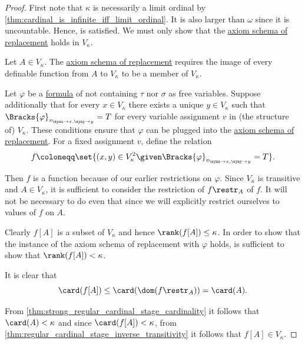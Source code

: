 \begin{proof}
  First note that \( \kappa \) is necessarily a limit ordinal by \cref{thm:cardinal_is_infinite_iff_limit_ordinal}. It is also larger than \( \omega \) since it is uncountable. Hence,  is satisfied. We must only show that the \hyperref[def:zfc/replacement]{axiom schema of replacement} holds in \( V_\kappa \).

  Let \( A \in V_\kappa \). The \hyperref[def:zfc/replacement]{axiom schema of replacement} requires the image of every definable function from \( A \) to \( V_\kappa \) to be a member of \( V_\kappa \).

  Let \( \varphi \) be a \hyperref[def:fol_formula]{formula} of \hyperref[def:zfc]{} not containing \( \tau \) nor \( \sigma \) as free variables. Suppose additionally that for every \( x \in V_\kappa \) there exists a unique \( y \in V_\kappa \) such that \( \Bracks{\varphi}_{v_{\synx \to x, \syny \to y}} = T \) for every variable assignment \( v \) in (the structure of) \( V_\kappa \). These conditions ensure that \( \varphi \) can be plugged into the \hyperref[def:zfc/replacement]{axiom schema of replacement}. For a fixed assignment \( v \), define the relation
  \begin{equation*}
    f \coloneqq \set{ (x, y) \in V_\kappa^2 \given \Bracks{\varphi}_{v_{\synx \to x, \syny \to y}} = T }.
  \end{equation*}

  Then \( f \) is a function because of our earlier restrictions on \( \varphi \). Since \( V_\kappa \) is transitive and \( A \in V_\kappa \), it is sufficient to consider the restriction of \( f\restr_A \) of \( f \). It will not be necessary to do even that since we will explicitly restrict ourselves to values of \( f \) on \( A \).

  Clearly \( f[A] \) is a subset of \( V_\kappa \) and hence \( \rank(f[A]) \leq \kappa \). In order to show that the instance of the axiom schema of replacement with \( \varphi \) holds, is sufficient to show that \( \rank(f[A]) < \kappa \).

  It is clear that
  \begin{equation*}
    \card(f[A]) \leq \card(\dom(f\restr_A)) = \card(A).
  \end{equation*}

  From \cref{thm:strong_regular_cardinal_stage_cardinality} it follows that \( \card(A) < \kappa \) and since \( \card(f[A]) < \kappa \), from \cref{thm:regular_cardinal_stage_inverse_transitivity} it follows that \( f[A] \in V_\kappa \).
\end{proof}

